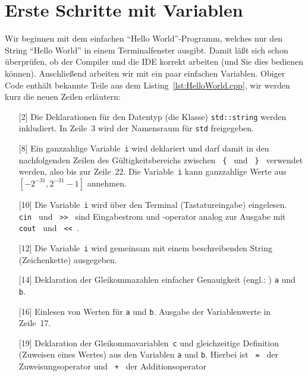 \newpage
\section{Erste Schritte mit Variablen}
\label{p:1.6}
%
Wir beginnen mit dem einfachen ``Hello World''-Programm, welches
nur den String ``Hello World'' in einem Terminalfenster ausgibt.
Damit läßt sich schon überprüfen, ob der Compiler und die IDE korrekt arbeiten
(und Sie dies bedienen können).
Anschließend arbeiten wir mit ein paar einfachen Variablen.
%
%
Obiger Code enthält bekannte Teile aus dem Listing~\ref{lst:HelloWorld.cpp}, wir werden
kurz die neuen Zeilen erläutern:
\begin{itemize}
	\item[{[2]}] Die Deklarationen für den Datentyp (die Klasse) \texttt{std::string}
	  werden inkludiert. In Zeile~3 wird der Namensraum für \verb|std| freigegeben.
	\item[{[8]}] Ein 
	{ganzzahlige Variable}~\texttt{i} wird deklariert und darf damit in
	  den nachfolgenden Zeilen des Gültigkeitsbereichs zwischen \verb| { |
	  und  \verb| } | verwendet werden, also bis zur Zeile~22. Die Variable~\texttt{i}
	  kann ganzzahlige Werte aus $[-2^{-31},2^{-31}-1]$ annehmen.
    \item[{[10]}] Die Variable~\texttt{i} wird über den Terminal (Tastatureingabe)
     eingelesen. \verb| cin | und \verb| >> | sind Eingabestrom und -operator analog
     zur Ausgabe mit \verb| cout | und \verb| << |.
    \item[{[12]}] Die Variable~\texttt{i} wird gemeinsam mit einem beschreibenden String
     (Zeichenkette) ausgegeben.
    \item[{[14]}] Deklaration der Gleikommazahlen einfacher Genauigkeit
     (engl.: )
    \texttt{a} und \texttt{b}.
    \item[{[16]}] Einlesen von Werten für \texttt{a} und \texttt{b}. Ausgabe der
     Variablenwerte in Zeile~17.
    \item[{[19]}] Deklaration der Gleikommavariablen~\texttt{c}  und gleichzeitige Definition
    (Zuweisen eines Wertes) aus den Variablen \texttt{a} und \texttt{b}.
      Hierbei ist \verb| = | der Zuweisungsoperator und \verb| + | der Additionsoperator

\end{itemize}
